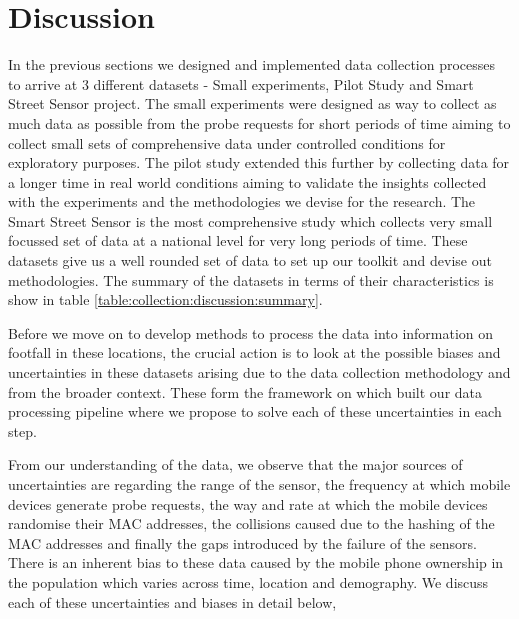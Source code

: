 \section{Discussion}
In the previous sections we designed and implemented data collection processes to arrive at 3 different datasets - Small experiments, Pilot Study and Smart Street Sensor project. 
The small experiments were designed as way to collect as much data as possible from the probe requests for short periods of time aiming to collect small sets of comprehensive data under controlled conditions for exploratory purposes.
The pilot study extended this further by collecting data for a longer time in real world conditions aiming to validate the insights collected with the experiments and the methodologies we devise for the research.
The Smart Street Sensor is the most comprehensive study which collects very small focussed set of data at a national level for very long periods of time.
These datasets give us a well rounded set of data to set up our toolkit and devise out methodologies.
The summary of the datasets in terms of their characteristics is show in table \ref{table:collection:discussion:summary}.

Before we move on to develop methods to process the data into information on footfall in these locations, the crucial action is to look at the possible biases and uncertainties in these datasets arising due to the data collection methodology and from the broader context.
These form the framework on which built our data processing pipeline where we propose to solve each of these uncertainties in each step.

From our understanding of the data, we observe that the major sources of uncertainties are regarding the range of the sensor, the frequency at which mobile devices generate probe requests, the way and rate at which the mobile devices randomise their MAC addresses, the collisions caused due to the hashing of the MAC addresses and finally the gaps introduced by the failure of the sensors.
There is an inherent bias to these data caused by the mobile phone ownership in the population which varies across time, location and demography.
We discuss each of these uncertainties and biases in detail below,


